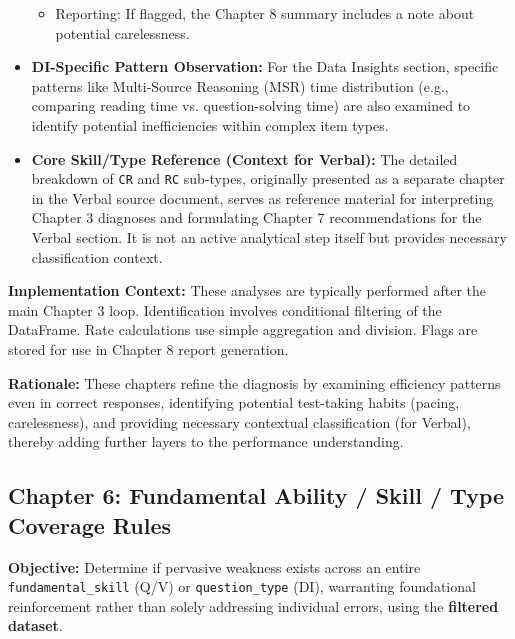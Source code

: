 \documentclass{article}
\begin{document}
\begin{itemize}
\begin{itemize}
        \item Reporting: If flagged, the Chapter 8 summary includes a note about potential carelessness.
    \end{itemize}
    \item \textbf{DI-Specific Pattern Observation:} For the Data Insights section, specific patterns like Multi-Source Reasoning (MSR) time distribution (e.g., comparing reading time vs. question-solving time) are also examined to identify potential inefficiencies within complex item types.
    \item \textbf{Core Skill/Type Reference (Context for Verbal):} The detailed breakdown of \texttt{CR} and \texttt{RC} sub-types, originally presented as a separate chapter in the Verbal source document, serves as reference material for interpreting Chapter 3 diagnoses and formulating Chapter 7 recommendations for the Verbal section. It is not an active analytical step itself but provides necessary classification context.
\end{itemize}

\textbf{Implementation Context:} These analyses are typically performed after the main Chapter 3 loop. Identification involves conditional filtering of the DataFrame. Rate calculations use simple aggregation and division. Flags are stored for use in Chapter 8 report generation.

\textbf{Rationale:} These chapters refine the diagnosis by examining efficiency patterns even in correct responses, identifying potential test-taking habits (pacing, carelessness), and providing necessary contextual classification (for Verbal), thereby adding further layers to the performance understanding.

\subsection{Chapter 6: Fundamental Ability / Skill / Type Coverage Rules}

\textbf{Objective:} Determine if pervasive weakness exists across an entire \texttt{fundamental\_skill} (Q/V) or \texttt{question\_type} (DI), warranting foundational reinforcement rather than solely addressing individual errors, using the \textbf{filtered dataset}.
\end{document}
